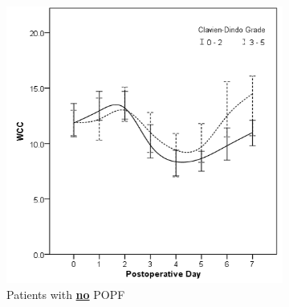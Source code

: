 \clearpage
\begin{figure}[t]
	\caption{Relationship between postoperative white cell count and clinically significant infective complications in patients without (A) and with (B) POPF.}
	\label{fig:crp_comp_WCC_infective_leak}
	\centering
	\begin{subfigure}{0.48\textwidth}
		\centering
		\includegraphics[width=\textwidth]{Figures/crp_comp_WCC_infective_leak0}
		\caption{Patients with \textbf{\underline{no}} POPF}
		\label{fig:crp_comp_WCC_infective_leak0}
	\end{subfigure}
	\hfill
	\begin{subfigure}{0.48\textwidth}
		\centering

\end{subfigure}
\end{figure}
